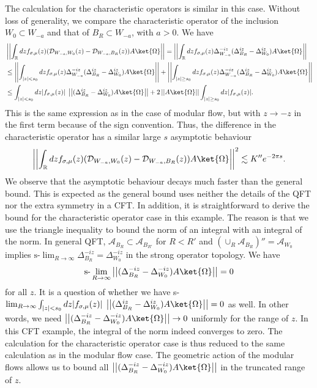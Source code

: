 \documentclass[a4paper,11pt]{article}
\theoremstyle{definition}
\theoremstyle{remark}
\begin{document}
The calculation for the characteristic operators is similar in this case. Without loss of generality, we compare the characteristic operator of the inclusion $W_0\subset W_{-a}$ and that of $B_R\subset W_{-a}$, with $a>0$. We have
\begin{align}
    &\left|\left|\int_\mathbb{R} dz f_{\sigma,\mu}(z)(\mathcal{D}_{W_{-a},W_0}(z) - \mathcal{D}_{W_{-a},B_R}(z))A\ket{\Omega}\right|\right| = \left|\left|\int_\mathbb{R} dz f_{\sigma,\mu}(z)\Delta_{W_{-a}}^{-iz}(\Delta_{B_R}^{iz} - \Delta_{W_0}^{iz})A\ket{\Omega}\right|\right| \\
    & \leq \left|\left|\int_{|z|<s_0} dz f_{\sigma,\mu}(z)\Delta_{W_{-a}}^{-iz}(\Delta_{B_R}^{iz} - \Delta_{W_0}^{iz})A\ket{\Omega}\right|\right| + \left|\left|\int_{|z|\geq s_0} dz f_{\sigma,\mu}(z)\Delta_{W_{-a}}^{-iz}(\Delta_{B_R}^{iz} - \Delta_{W_0}^{iz})A\ket{\Omega}\right|\right|\\
    &\leq \int_{|z|<s_0} dz |f_{\sigma,\mu}(z)|\;\left|\left|(\Delta_{B_R}^{iz} - \Delta_{W_0}^{iz})A\ket{\Omega}\right|\right| + 2 \left|\left|A\ket{\Omega}\right|\right|\int_{|z|\geq s_0} dz |f_{\sigma,\mu}(z)|.
\end{align}
This is the same expression as in the case of modular flow, but with $z\to-z$ in the first term because of the sign convention. Thus, the difference in the characteristic operator has a similar large $s$ asymptotic behaviour
\begin{align}
    \left|\left|\int_\mathbb{R} dz f_{\sigma,\mu}(z)(\mathcal{D}_{W_{-a},W_0}(z) - \mathcal{D}_{W_{-a},B_R}(z))A\ket{\Omega}\right|\right|^2 \lesssim K''e^{-2\pi s}.
\end{align}
We observe that the asymptotic behaviour decays much faster than the general bound. This is expected as the general bound uses neither the details of the QFT nor the extra symmetry in a CFT. In addition, it is straightforward to derive the bound for the characteristic operator case in this example. The reason is that we use the triangle inequality to bound the norm of an integral with an integral of the norm. In general QFT, $\mathcal{A}_{B_{R}} \subset \mathcal{A}_{B_{R'}}$ for $R<R'$ and $(\cup_R \mathcal{A}_{B_{R}})'' = \mathcal{A}_{W_0}$ implies $\text{s-}\lim_{R\to\infty} \Delta^{-iz}_{B_{R}} = \Delta^{-iz}_{W_0}$ in the strong operator topology. We have
\begin{align}
    \text{s-}\lim_{R\to \infty}\left|\left|(\Delta_{B_{R}}^{-iz} - \Delta_{W_0}^{-iz})A\ket{\Omega}\right|\right| = 0
\end{align}
for all $z$. It is a question of whether we have s-$\lim_{R\to\infty}\int_{|z|<s_0} dz |f_{\sigma,\mu}(z)|\;\left|\left|(\Delta_{B_R}^{iz} - \Delta_{W_0}^{iz})A\ket{\Omega}\right|\right| = 0$ as well. In other words, we need $\left|\left|(\Delta_{B_{R}}^{-iz} - \Delta_{W_0}^{-iz})A\ket{\Omega}\right|\right| \to 0$ uniformly for the range of $z$. In this CFT example, the integral of the norm indeed converges to zero. The calculation for the characteristic operator case is thus reduced to the same calculation as in the modular flow case. The geometric action of the modular flows allows us to bound all $\left|\left|(\Delta_{B_{R}}^{-iz} - \Delta_{W_0}^{-iz})A\ket{\Omega}\right|\right|$ in the truncated range of $z$.
\end{document}
